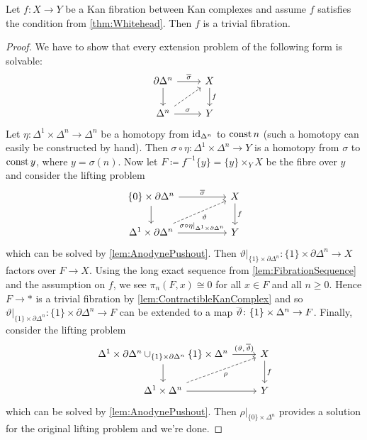 \begin{lem}\label{lem:TrivialFibration}
	Let $f\colon X\rightarrow Y$ be a Kan fibration between Kan complexes and assume $f$ satisfies the condition from \cref{thm:Whitehead}. Then $f$ is a trivial fibration.
\end{lem}
\begin{proof}
	We have to show that every extension problem of the following form is solvable:
	\begin{equation*}
		\begin{tikzcd}
			\partial\Delta^n\rar["\ov\sigma"]\dar& X\dar["f"]\\
			\Delta^n\urar[dashed]\rar["\sigma"] & Y
		\end{tikzcd}
	\end{equation*}
	Let $\eta\colon\Delta^1\times\Delta^n\rightarrow\Delta^n$ be a homotopy from $\operatorname{id}_{\Delta^n}$ to $\operatorname{const} n$ (such a homotopy can easily be constructed by hand). Then $\sigma\circ \eta\colon\Delta^1\times\Delta^n\rightarrow Y$ is a homotopy from $\sigma$ to $\operatorname{const} y$, where $y=\sigma(n)$. Now let $F\coloneqq f^{-1}\{y\}=\{y\}\times_YX$ be the fibre over $y$ and consider the lifting problem
	\begin{equation*}
		\begin{tikzcd}[column sep=huge]
			\{0\}\times\partial\Delta^n\rar["\ov\sigma"]\dar & X\dar["f"]\\
			\Delta^1\times\partial\Delta^n\urar[dashed,"\vartheta"']\rar["\sigma\circ\eta|_{\Delta^1\times\partial\Delta^n}"] & Y
		\end{tikzcd}
	\end{equation*}
	which can be solved by \cref{lem:AnodynePushout}. Then $\vartheta|_{\{1\}\times\partial\Delta^n}\colon \{1\}\times\partial\Delta^n\rightarrow X$ factors over $F\rightarrow X$. Using the long exact sequence from \cref{lem:FibrationSequence} and the assumption on $f$, we see $\pi_n(F,x)\cong0$ for all $x\in F$ and all $n\geqslant 0$. Hence $F\rightarrow *$ is a trivial fibration by \cref{lem:ContractibleKanComplex} and so $\vartheta|_{\{1\}\times\partial\Delta^n}\colon \{1\}\times\partial\Delta^n\rightarrow F$ can be extended to a map $\ov\vartheta\colon \{1\}\times\Delta^n\rightarrow F$. Finally, consider the lifting problem
	\begin{equation*}
		\begin{tikzcd}
			\Delta^1\times\partial\Delta^n\cup_{\{1\}\times\partial\Delta^n}\{1\}\times\Delta^n\rar["{(\vartheta,\,\ov\vartheta)}"]\dar & X\dar["f"]\\
			\Delta^1\times\Delta^n\urar[dashed,"\rho"']\rar & Y
		\end{tikzcd}
	\end{equation*}
	which can be solved by \cref{lem:AnodynePushout}. Then $\rho|_{\{0\}\times\Delta^n}$ provides a solution for the original lifting problem and we're done.
\end{proof}
